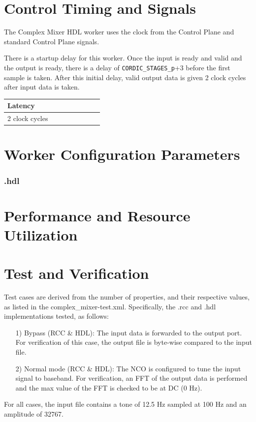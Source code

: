 \section*{Control Timing and Signals}
\begin{flushleft}
	The Complex Mixer HDL worker uses the clock from the Control Plane and standard Control Plane signals.\medskip

	There is a startup delay for this worker. Once the input is ready and valid and the output is ready, there is a delay of \verb+CORDIC_STAGES_p++3 before the first sample is taken. After this initial delay, valid output data is given 2 clock cycles after input data is taken.

	\begin{tabular}{|M{4.5cm}|M{1cm}|M{1cm}|M{1.5cm}|M{2cm}|M{1cm}|M{1cm}|M{2.5cm}|}
		\hline
		Latency         \\
		 clock cycles  \\
		\hline
	\end{tabular}
\end{flushleft}

\begin{landscape}
\section*{Worker Configuration Parameters}
\subsubsection*{\comp.hdl}
%
\section*{Performance and Resource Utilization}
%
\end{landscape}
\section*{Test and Verification}
Test cases are derived from the number of properties, and their respective values, as listed in the complex\_mixer-test.xml. Specifically, the \comp.rcc and \comp.hdl implementations tested, as follows:
\begin{itemize}
	\item[1)] Bypass (RCC \& HDL): The input data is forwarded to the output port. For verification of this case, the output file is byte-wise compared to the input file.
	\item[2)] Normal mode (RCC \& HDL): The NCO is configured to tune the input signal to baseband. For verification, an FFT of the output data is performed and the max value of the FFT is checked to be at DC (0 Hz).
\end{itemize}
\noindent For all cases, the input file contains a tone of 12.5 Hz sampled at 100 Hz and an amplitude of 32767.\par\medskip


